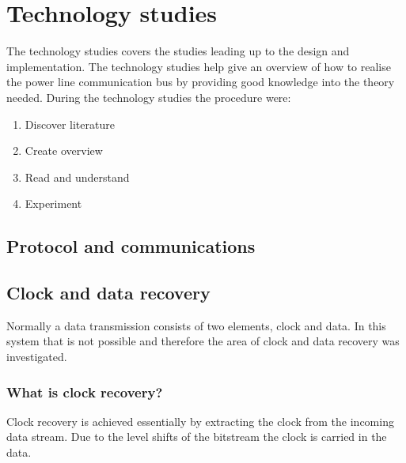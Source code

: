 \chapter{Technology studies}

The technology studies covers the studies leading up to the design and implementation. The technology studies help give an overview of how to realise the power line communication bus by providing good knowledge into the theory needed. During the technology studies the procedure were:
\begin{enumerate}
\item Discover literature
\item Create overview
\item Read and understand
\item Experiment
\end{enumerate}


\section{Protocol and communications}


\section{Clock and data recovery}
Normally a data transmission consists of two elements, clock and data. In this system that is not possible and therefore the area of clock and data recovery was investigated.

\subsection{What is clock recovery?}
Clock recovery is achieved essentially by extracting the clock from the incoming data stream. Due to the level shifts of the bitstream the clock is carried in the data.
